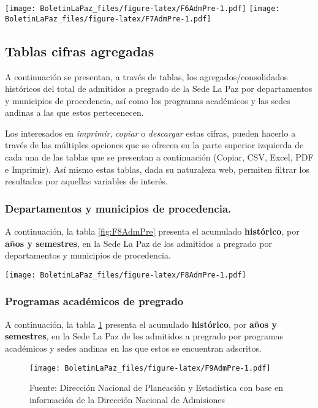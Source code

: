 \documentclass[
]{book}
\begin{document}
\texttt{[image: BoletinLaPaz\_files/figure-latex/F6AdmPre-1.pdf]}
\texttt{[image: BoletinLaPaz\_files/figure-latex/F7AdmPre-1.pdf]}

\hypertarget{tablas-cifras-agregadas-1}{%
\subsection{Tablas cifras agregadas}\label{tablas-cifras-agregadas-1}}

A continuación se presentan, a través de tablas, los agregados/consolidados históricos del total de admitidos a pregrado de la Sede La Paz por departamentos y municipios de procedencia, así como los programas académicos y las sedes andinas a las que estos pertecenecen.

Los interesados en \emph{imprimir}, \emph{copiar} o \emph{descargar} estas cifras, pueden hacerlo a través de las múltiples opciones que se ofrecen en la parte superior izquierda de cada una de las tablas que se presentan a continuación (Copiar, CSV, Excel, PDF e Imprimir). Así mismo estas tablas, dada su naturaleza web, permiten filtrar los resultados por aquellas variables de interés.

\hypertarget{departamentos-y-municipios-de-procedencia.}{%
\subsubsection{Departamentos y municipios de procedencia.}\label{departamentos-y-municipios-de-procedencia.}}

A continuación, la tabla \ref{fig:F8AdmPre} presenta el acumulado \textbf{histórico}, por \textbf{años y semestres}, en la Sede La Paz de los admitidos a pregrado por departamentos y municipios de procedencia.

\texttt{[image: BoletinLaPaz\_files/figure-latex/F8AdmPre-1.pdf]}

\hypertarget{programas-acaduxe9micos-de-pregrado}{%
\subsubsection{Programas académicos de pregrado}\label{programas-acaduxe9micos-de-pregrado}}

A continuación, la tabla \ref{fig:F9AdmPre} presenta el acumulado \textbf{histórico}, por \textbf{años y semestres}, en la Sede La Paz de los admitidos a pregrado por programas académicos y sedes andinas en las que estos se encuentran adscritos.

\begin{figure}
\centering
\texttt{[image: BoletinLaPaz\_files/figure-latex/F9AdmPre-1.pdf]}
\caption{\label{fig:F9AdmPre}Fuente: Dirección Nacional de Planeación y Estadística con base en información de la Dirección Nacional de Admisiones}
\end{figure}
\end{document}
